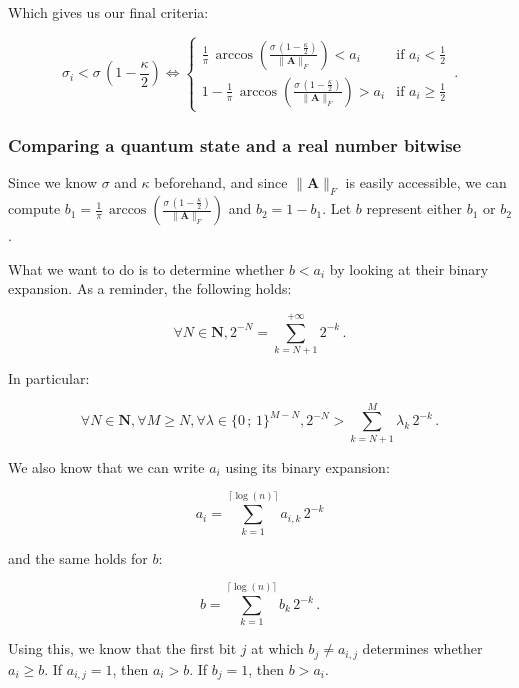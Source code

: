 \documentclass[11pt, a4paper]{article}
\begin{document}
                Which gives us our final criteria:
                
                \[\sigma_i < \sigma\,\left(1 - \frac\kappa2\right)\iff\begin{cases}\frac1\pi\,\arccos\left(\frac{\sigma\,\left(1 - \frac\kappa2\right)}{\|\mathbf{A}\|_F}\right) < a_i&\text{if }a_i<\frac12\\1-\frac1\pi\,\arccos\left(\frac{\sigma\,\left(1 - \frac\kappa2\right)}{\|\mathbf{A}\|_F}\right) > a_i&\text{if }a_i\geqslant\frac12\end{cases}\,.\]
            
            \subsubsection{Comparing a quantum state and a real number bitwise}
                Since we know \(\sigma\) and \(\kappa\) beforehand, and since \(\|\mathbf{A}\|_F\) is easily accessible, we can compute \(b_1=\frac1\pi\,\arccos\left(\frac{\sigma\,\left(1 - \frac\kappa2\right)}{\|\mathbf{A}\|_F}\right)\) and \(b_2 = 1 - b_1\). Let \(b\) represent either \(b_1\) or \(b_2\).
                
                What we want to do is to determine whether \(b<a_i\) by looking at their binary expansion. As a reminder, the following holds:
                
                \[\forall N\in\mathbf{N},2^{-N}=\sum_{k=N+1}^{+\infty}2^{-k}\,.\]
                
                In particular:
                
                \[\forall N\in\mathbf{N},\forall M\geqslant N,\forall \lambda\in\{0\,;\,1\}^{M-N},2^{-N}>\sum_{k=N+1}^M\lambda_k\,2^{-k}\,.\]
                
                We also know that we can write \(a_i\) using its binary expansion:
                
                \[a_i=\sum_{k=1}^{\lceil\log(n)\rceil}a_{i,k}\,2^{-k}\]
                
                and the same holds for \(b\):
                
                \[b=\sum_{k=1}^{\lceil\log(n)\rceil}b_{k}\,2^{-k}\,.\]
                
                Using this, we know that the first bit \(j\) at which \(b_j\neq a_{i,j}\) determines whether \(a_i\geqslant b\). If \(a_{i,j}=1\), then \(a_i>b\). If \(b_j=1\), then \(b>a_i\).
                
\end{document}
